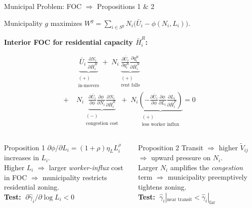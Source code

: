 \documentclass[10pt]{beamer}
\begin{document}
\begin{frame}[shrink=5]{Municipal Problem: FOC $\Rightarrow$ Propositions 1 \& 2}

Municipality $g$ maximizes $W^g = \sum_{i\in S^g} N_i\bigl(\bar U_i - \phi(N_i,L_i)\bigr)$.

\smallskip
\textbf{Interior FOC for residential capacity $\bar H_i^R$:}

{\small
\begin{align*}
&\underbrace{\bar U_i\,\frac{\partial N_i}{\partial \bar H_i^R}}_{\substack{(+)\\\text{in-movers}}}
+\;
N_i\underbrace{\frac{\partial \bar U_i}{\partial q_i^R}\frac{\partial q_i^R}{\partial \bar H_i^R}}_{\substack{(+)\\\text{rent falls}}}\\[8pt]
+\;&
N_i\underbrace{\frac{\partial \bar U_i}{\partial \phi}\frac{\partial \phi}{\partial N_i}\frac{\partial N_i}{\partial \bar H_i^R}}_{\substack{(-)\\\text{congestion cost}}}
+\;
N_i\underbrace{\left(-\frac{\partial \bar U_i}{\partial \phi}\frac{\partial \phi}{\partial L_i}\frac{\partial L_i}{\partial \bar H_i^F}\right)}_{\substack{(+)\\\text{less worker influx}}}
= 0
\end{align*}
}

\begin{columns}[T]
\begin{alertblock}{Proposition 1}
  \small
  $\partial\phi/\partial L_i = (1+\rho)\eta_L L_i^{\rho}$ increases in $L_i$.\\[3pt]
  Higher $L_i$ $\Rightarrow$ larger \emph{worker-influx} cost in FOC $\Rightarrow$ municipality restricts residential zoning.\\[4pt]
  \textbf{Test:} $\;\partial\hat\gamma_i/\partial\log L_i < 0$
\end{alertblock}

\begin{block}{Proposition 2}
  \small
  Transit $\Rightarrow$ higher $\tilde V_{ij}$ $\Rightarrow$ upward pressure on $N_i$.\\[3pt]
  Larger $N_i$ amplifies the \emph{congestion} term $\Rightarrow$ municipality preemptively tightens zoning.\\[4pt]
  \textbf{Test:} $\;\hat\gamma_i|_{\text{near transit}} < \hat\gamma_i|_{\text{far}}$
\end{block}
\end{columns}

\end{frame}
\end{document}
